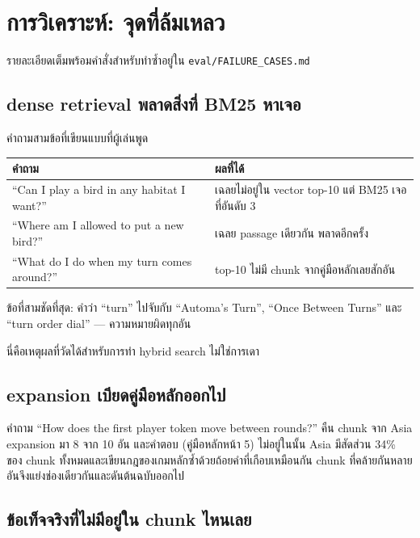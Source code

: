 \documentclass[11pt,a4paper]{article}
\newcommand{\thead}[1]{\textbf{#1}}
\newcommand{\code}[1]{\texttt{\small #1}}
\begin{document}
\section{การวิเคราะห์: จุดที่ล้มเหลว}

รายละเอียดเต็มพร้อมคำสั่งสำหรับทำซ้ำอยู่ใน \code{eval/FAILURE\_CASES.md}

\subsection{dense retrieval พลาดสิ่งที่ BM25 หาเจอ}
\label{sec:bm25wins}

คำถามสามข้อที่เขียนแบบที่ผู้เล่นพูด

\begin{table}[H]
\centering
\small
\begin{tabular}{@{}L{6.4cm} L{7.9cm}@{}}
\toprule
\thead{คำถาม} & \thead{ผลที่ได้} \\
\midrule
“Can I play a bird in any habitat I want?” & เฉลยไม่อยู่ใน vector top-10 แต่ BM25 เจอที่อันดับ 3 \\
“Where am I allowed to put a new bird?” & เฉลย passage เดียวกัน พลาดอีกครั้ง \\
“What do I do when my turn comes around?” & top-10 ไม่มี chunk จากคู่มือหลักเลยสักอัน \\
\bottomrule
\end{tabular}
\end{table}

ข้อที่สามชัดที่สุด: คำว่า “turn” ไปจับกับ “Automa's Turn”, “Once Between Turns”
และ “turn order dial” --- ความหมายผิดทุกอัน

นี่คือเหตุผลที่วัดได้สำหรับการทำ hybrid search ไม่ใช่การเดา

\subsection{expansion เบียดคู่มือหลักออกไป}
\label{sec:crowding}

คำถาม “How does the first player token move between rounds?” คืน chunk จาก Asia
expansion มา 8 จาก 10 อัน และคำตอบ (คู่มือหลักหน้า 5) ไม่อยู่ในนั้น Asia มีสัดส่วน 34\%
ของ chunk ทั้งหมดและเขียนกฎของเกมหลักซ้ำด้วยถ้อยคำที่เกือบเหมือนกัน
chunk ที่คล้ายกันหลายอันจึงแย่งช่องเดียวกันและดันต้นฉบับออกไป

\subsection{ข้อเท็จจริงที่ไม่มีอยู่ใน chunk ไหนเลย}
\end{document}
